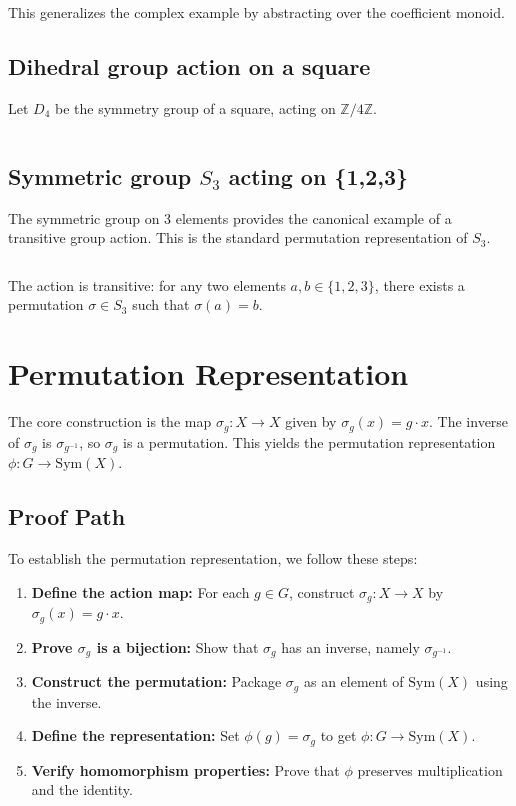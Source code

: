 \documentclass[
  12pt, %
]{assignment}
\newcommand{\leancodeurl}{}
\newcommand{\setleancodeurl}[1]{\renewcommand{\leancodeurl}{#1}}
\newcommand{\leancodefile}[3][]{%
  \setleancodeurl{#3}%
  \inputminted[fontsize=\footnotesize,breaklines,breakanywhere,tabsize=4,showspaces=false,linenos=true,#1]{lean4}{#2}%
}
\begin{document}
\leancodefile[firstline=103,lastline=115,firstnumber=103]{../lean/GroupAction/Examples.lean}{https://github.com/FrankieeW/GroupAction/blob/v1.2.0/lean/GroupAction/Examples.lean}

This generalizes the complex example by abstracting over the coefficient monoid.

\subsection{Dihedral group action on a square}
Let $D_4$ be the symmetry group of a square, acting on $\mathbb{Z}/4\mathbb{Z}$.

\leancodefile[firstline=139,lastline=155,firstnumber=139]{../lean/GroupAction/Examples.lean}{https://github.com/FrankieeW/GroupAction/blob/v1.2.0/lean/GroupAction/Examples.lean}

\subsection{Symmetric group $S_3$ acting on \{1,2,3\}}
The symmetric group on 3 elements provides the canonical example of a transitive group action. This is the standard permutation representation of $S_3$.

\leancodefile[firstline=173,lastline=180,firstnumber=173]{../lean/GroupAction/Examples.lean}{https://github.com/FrankieeW/GroupAction/blob/v1.2.0/lean/GroupAction/Examples.lean}

The action is transitive: for any two elements $a, b \in \{1,2,3\}$, there exists a permutation $\sigma \in S_3$ such that $\sigma(a) = b$.

\section{Permutation Representation}
The core construction is the map $\sigma_g : X \to X$ given by $\sigma_g(x) = g \cdot x$.
The inverse of $\sigma_g$ is $\sigma_{g^{-1}}$, so $\sigma_g$ is a permutation.
This yields the permutation representation $\phi : G \to \mathrm{Sym}(X)$.

\subsection{Proof Path}
To establish the permutation representation, we follow these steps:

\begin{enumerate}
	\item \textbf{Define the action map:} For each $g \in G$, construct $\sigma_g : X \to X$ by $\sigma_g(x) = g \cdot x$.
	\item \textbf{Prove $\sigma_g$ is a bijection:} Show that $\sigma_g$ has an inverse, namely $\sigma_{g^{-1}}$.
	\item \textbf{Construct the permutation:} Package $\sigma_g$ as an element of $\mathrm{Sym}(X)$ using the inverse.
	\item \textbf{Define the representation:} Set $\phi(g) = \sigma_g$ to get $\phi : G \to \mathrm{Sym}(X)$.
	\item \textbf{Verify homomorphism properties:} Prove that $\phi$ preserves multiplication and the identity.
\end{enumerate}
\end{document}
